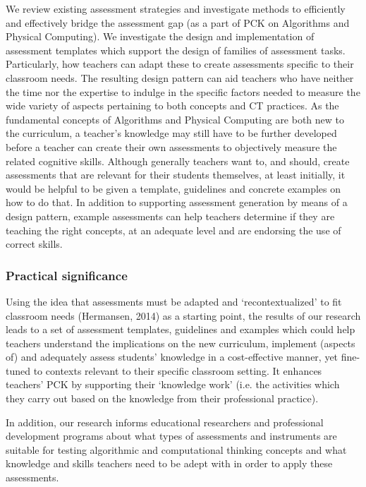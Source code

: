 We review existing assessment strategies and investigate methods to efficiently and effectively bridge the assessment gap (as a part of PCK on Algorithms and Physical Computing). We investigate the design and implementation of assessment templates which support the design of families of assessment tasks. Particularly, how teachers can adapt these to create assessments specific to their classroom needs. The resulting design pattern can aid teachers who have neither the time nor the expertise to indulge in the specific factors needed to measure the wide variety of aspects pertaining to both concepts and CT practices. As the fundamental concepts of Algorithms and Physical Computing are both new to the curriculum, a teacher’s knowledge may still have to be further developed before a teacher can create their own assessments to objectively measure the related cognitive skills. Although generally teachers want to, and should, create assessments that are relevant for their students themselves, at least initially, it would be helpful to be given a template, guidelines and concrete examples on how to do that. In addition to supporting assessment generation by means of a design pattern, example assessments can help teachers determine if they are teaching the right concepts, at an adequate level and are endorsing the use of correct skills.



\subsubsection*{Practical significance}
Using the idea that assessments must be adapted and ‘recontextualized’ to fit classroom needs (Hermansen, 2014) as a starting point, the results of our research leads to a set of assessment templates, guidelines and examples which could help teachers understand the implications on the new curriculum, implement (aspects of) and adequately assess students’ knowledge in a cost-effective manner, yet fine-tuned to contexts relevant to their specific classroom setting. It enhances teachers’ PCK by supporting their ‘knowledge work’ (i.e. the activities which they carry out based on the knowledge from their professional practice).%

In addition, our research informs educational researchers and professional development programs about what types of assessments and instruments are suitable for testing algorithmic and computational thinking concepts and what knowledge and skills teachers need to be adept with in order to apply these assessments.

